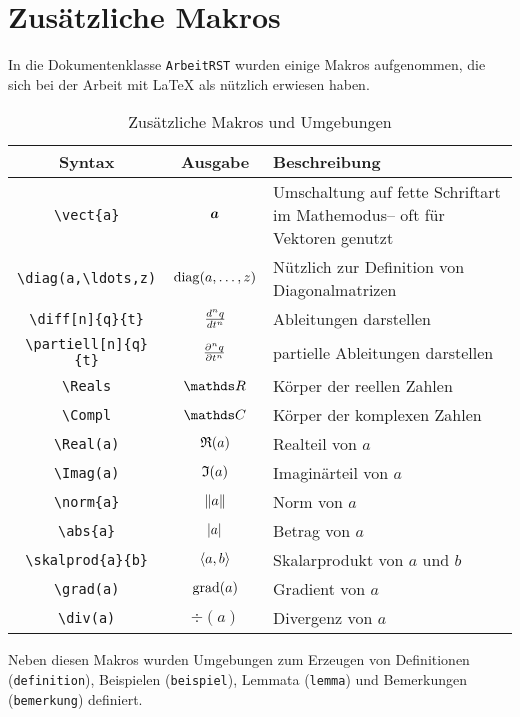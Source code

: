 \section{Zusätzliche Makros}
In die Dokumentenklasse \texttt{ArbeitRST} wurden einige Makros aufgenommen, die sich bei der Arbeit mit \LaTeX{} als nützlich erwiesen haben.
\begin{table}[htbp]
\centering
\caption{Zusätzliche Makros und Umgebungen}
\begin{tabular}{ccp{9cm}}
Syntax & Ausgabe & Beschreibung\\
\toprule
\texttt{\textbackslash vect\{a\}} & $\vect{a}$ & Umschaltung auf fette Schriftart im Mathemodus-- oft für Vektoren genutzt\\[2ex]
\texttt{\textbackslash diag(a,\textbackslash ldots,z)} & $\diag(a,\ldots,z)$ & Nützlich zur Definition von Diagonalmatrizen\\[2ex]
\texttt{\textbackslash diff[n]\{q\}\{t\}} & $\diff[n]{q}{t}$ & Ableitungen darstellen\\[2ex]
\texttt{\textbackslash partiell[n]\{q\}\{t\}} & $\partiell[n]{q}{t}$ & partielle Ableitungen darstellen\\[2ex]
\texttt{\textbackslash Reals} & $\Reals$ & Körper der reellen Zahlen\\[2ex]
\texttt{\textbackslash Compl} & $\Compl$ & Körper der komplexen Zahlen\\[2ex]
\texttt{\textbackslash Real(a)} & $\Real(a)$ & Realteil von $a$\\[2ex]
\texttt{\textbackslash Imag(a)} & $\Imag(a)$ & Imaginärteil von $a$\\[2ex]
\texttt{\textbackslash norm\{a\}} & $\norm{a}$ & Norm von $a$\\[2ex]
\texttt{\textbackslash abs\{a\}} & $\abs{a}$ & Betrag von $a$\\[2ex]
\texttt{\textbackslash skalprod\{a\}\{b\}} & $\skalprod{a}{b}$ & Skalarprodukt von $a$ und $b$\\[2ex]
\texttt{\textbackslash grad(a)} & $\grad(a)$ & Gradient von $a$\\[2ex]
\texttt{\textbackslash div(a)} & $\div(a)$ & Divergenz von $a$\\
\bottomrule
\end{tabular}
\end{table}


Neben diesen Makros wurden Umgebungen zum Erzeugen von Definitionen (\verb|definition|), Beispielen (\verb|beispiel|), Lemmata (\verb|lemma|) und Bemerkungen (\verb|bemerkung|) definiert.

